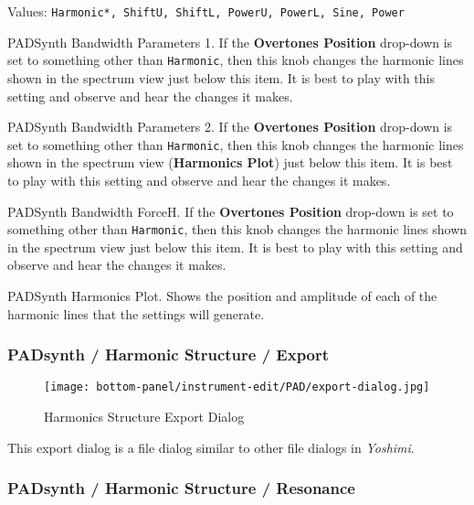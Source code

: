    Values: \texttt{Harmonic*, ShiftU, ShiftL, PowerU, PowerL, Sine, Power}

   PADSynth Bandwidth Parameters 1.
   If the \textbf{Overtones Position} drop-down is set to something other than
   \texttt{Harmonic}, then this knob changes the harmonic lines shown in the
   spectrum view just below this item.
   It is best to play with this setting and observe and hear the changes it
   makes.

   PADSynth Bandwidth Parameters 2.
   If the \textbf{Overtones Position} drop-down is set to something other than
   \texttt{Harmonic}, then this knob changes the harmonic lines shown in the
   spectrum view (\textbf{Harmonics Plot}) just below this item.
   It is best to play with this setting and observe and hear the changes it
   makes.

   PADSynth Bandwidth ForceH.
   If the \textbf{Overtones Position} drop-down is set to something other than
   \texttt{Harmonic}, then this knob changes the harmonic lines shown in the
   spectrum view just below this item.
   It is best to play with this setting and observe and hear the changes it
   makes.

   PADSynth Harmonics Plot.
   Shows the position and amplitude of each of the harmonic lines that the
   settings will generate.

\subsubsection{PADsynth / Harmonic Structure / Export}
\label{subsubsec:padsynth_harmonic_structure_export}

\begin{figure}[H]
   \centering 
   \texttt{[image: bottom-panel/instrument-edit/PAD/export-dialog.jpg]}
   \caption{Harmonics Structure Export Dialog}
   \label{fig:harmonics_structure_export_dialog}
\end{figure}

   This export dialog is a file dialog similar to other file dialogs
   in \textsl{Yoshimi}.

\subsubsection{PADsynth / Harmonic Structure / Resonance}
\label{subsubsec:padsynth_harmonic_structure_resonance}

